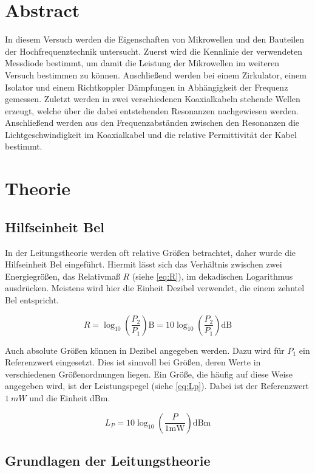 \section{Abstract}
In diesem Versuch werden die Eigenschaften von Mikrowellen und den Bauteilen der Hochfrequenztechnik untersucht. Zuerst wird die Kennlinie der verwendeten Messdiode bestimmt, um damit die Leistung der Mikrowellen im weiteren Versuch bestimmen zu können. Anschließend werden bei einem Zirkulator, einem Isolator und einem Richtkoppler Dämpfungen in Abhängigkeit der Frequenz gemessen. Zuletzt werden in zwei verschiedenen Koaxialkabeln stehende Wellen erzeugt, welche über die dabei entstehenden Resonanzen nachgewiesen werden. Anschließend werden aus den Frequenzabständen zwischen den Resonanzen die Lichtgeschwindigkeit im Koaxialkabel und die relative Permittivität der Kabel bestimmt.

\section{Theorie}
\subsection{Hilfseinheit Bel}
In der Leitungstheorie werden oft relative Größen betrachtet, daher wurde die Hilfseinheit Bel eingeführt. Hiermit lässt sich das Verhältnis zwischen zwei Energiegrößen, das Relativmaß $R$ (siehe \cref{eq:R}), im dekadischen Logarithmus ausdrücken. Meistens wird hier die Einheit Dezibel verwendet, die einem zehntel Bel entspricht.

\begin{equation}
	R = \log_{10} \left( \frac{P_2}{P_1}\right) \text{B} =10 \log_{10} \left( \frac{P_2}{P_1}\right) \text{dB}
	\label{eq:R}
\end{equation}

Auch absolute Größen können in Dezibel angegeben werden. Dazu wird für $P_1$ ein Referenzwert eingesetzt. Dies ist sinnvoll bei Größen, deren Werte in verschiedenen Größenordnungen liegen. Ein Größe, die häufig auf diese Weise angegeben wird, ist der Leistungspegel (siehe \cref{eq:Lp}). Dabei ist der Referenzwert $\SI{1}{mW}$ und die Einheit dBm.

\begin{equation}
	L_P = 10\log_{10}\left( \frac{P}{1\text{mW}}\right) \text{dBm}
	\label{eq:Lp}
\end{equation}

\subsection{Grundlagen der Leitungstheorie}
